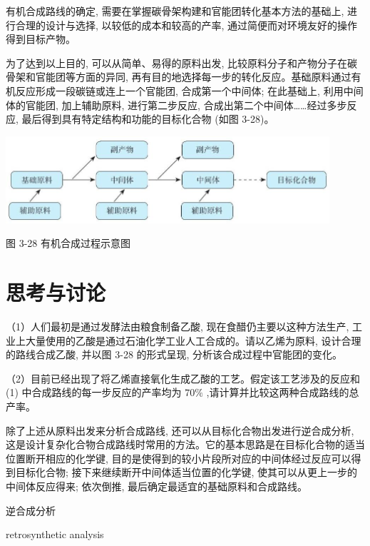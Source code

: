 \documentclass[10pt]{article}
\begin{document}
有机合成路线的确定, 需要在掌握碳骨架构建和官能团转化基本方法的基础上, 进行合理的设计与选择, 以较低的成本和较高的产率, 通过简便而对环境友好的操作得到目标产物。

为了达到以上目的, 可以从简单、易得的原料出发, 比较原料分子和产物分子在碳骨架和官能团等方面的异同, 再有目的地选择每一步的转化反应。基础原料通过有机反应形成一段碳链或连上一个官能团, 合成第一个中间体; 在此基础上, 利用中间体的官能团, 加上辅助原料, 进行第二步反应, 合成出第二个中间体……经过多步反应, 最后得到具有特定结构和功能的目标化合物 (如图 3-28)。

\begin{center}
\includegraphics[max width=0.9\textwidth]{images/0190efc5-b58a-7c43-bfb0-e0a030df9cfd_92_398265.jpg}
\end{center}

图 3-28 有机合成过程示意图

\section*{思考与讨论}

（1）人们最初是通过发酵法由粮食制备乙酸, 现在食醋仍主要以这种方法生产, 工业上大量使用的乙酸是通过石油化学工业人工合成的。请以乙烯为原料, 设计合理的路线合成乙酸, 并以图 3-28 的形式呈现, 分析该合成过程中官能团的变化。

（2）目前已经出现了将乙烯直接氧化生成乙酸的工艺。假定该工艺涉及的反应和 (1) 中合成路线的每一步反应的产率均为 \({70}\%\) ,请计算并比较这两种合成路线的总产率。

除了上述从原料出发来分析合成路线, 还可以从目标化合物出发进行逆合成分析, 这是设计复杂化合物合成路线时常用的方法。它的基本思路是在目标化合物的适当位置断开相应的化学键, 目的是使得到的较小片段所对应的中间体经过反应可以得到目标化合物; 接下来继续断开中间体适当位置的化学键, 使其可以从更上一步的中间体反应得来; 依次倒推, 最后确定最适宜的基础原料和合成路线。

\begin{mdframed}

逆合成分析

retrosynthetic analysis

\end{mdframed}
\end{document}
